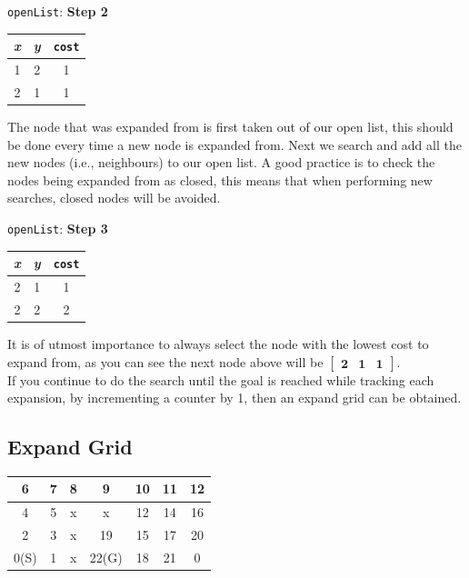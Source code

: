 \documentclass[twoside,11pt]{article}
\begin{document}
\texttt{openList}: \textbf{Step 2}
\begin{table}[ht]
	\label{tab:step-2}
	\begin{center}
		\begin{tabular}{|c|c|c|}
			\hline
			\textit{x} & \textit{y} & \texttt{cost} \\
			\hline
			1 & 2 & 1\\
			\hline
			2 & 1 & 1\\
			\hline
		\end{tabular}
	\end{center}
\end{table}

The node that was expanded from is first taken out of our open list, this should be done every time
a new node is expanded from. Next we search and add all the new nodes (i.e., neighbours) to our
open list. A good practice is to check the nodes being expanded from as closed, this means that
when performing new searches, closed nodes will be avoided.

\texttt{openList}: \textbf{Step 3}
\begin{table}[ht]
	\label{tab:step-3}
	\begin{center}
		\begin{tabular}{|c|c|c|}
			\hline
			\textit{x} & \textit{y} & \texttt{cost} \\
			\hline
			2 & 1 & 1\\
			\hline
			2 & 2 & 2\\
			\hline
		\end{tabular}
	\end{center}
\end{table}

It is of utmost importance to always select the node with the lowest cost to expand from, as you
can see the next node above will be $\begin{bmatrix}
\mathbf{2} & \mathbf{1} & \mathbf{1}\end{bmatrix}$.\\
If you continue to do the search until the goal is reached while tracking each expansion, by incrementing a counter by 1, then an expand grid can be obtained.

\subsection*{Expand Grid}
\begin{table}[h!]
	\label{tab:map-3}
	\begin{center}
		\begin{tabular}{|c|c|c|c|c|c|c|}
			\hline
			6 & 7 & 8 & 9 & 10 & 11 & 12 \\
			\hline
			4 & 5 & x & x & 12 & 14 & 16 \\
			\hline
			2 & 3 & x & 19 & 15 & 17 & 20 \\
			\hline
			0(S) & 1 & x & 22(G) & 18 & 21 & 0 \\
			\hline
		\end{tabular}
	\end{center}
\end{table}
\end{document}
